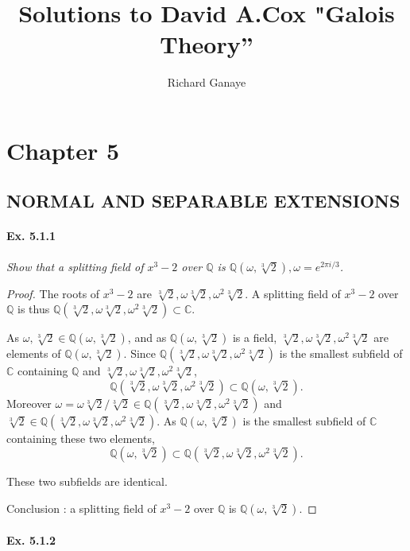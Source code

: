 \documentclass[11pt,a4paper]{article}
\title{Solutions to David A.Cox  "Galois Theory''}
\author{Richard Ganaye}
\newcommand{\Q}{\mathbb{Q}}
\newcommand{\C}{\mathbb{C}}
\begin{document}
\maketitle

\section{Chapter 5}

\subsection{NORMAL AND SEPARABLE EXTENSIONS}

\paragraph{Ex. 5.1.1}

{\it Show that a splitting field of $x^3-2$ over $\Q$ is $\Q(\omega,\sqrt[3]{2}), \omega = e^{2\pi i/3}$.
}

\begin{proof}
The roots of $x^3-2$ are $\sqrt[3]{2},\omega \sqrt[3]{2},\omega^2 \sqrt[3]{2}$. A splitting field of $x^3-2$ over $\Q$ is thus $\Q(\sqrt[3]{2},\omega \sqrt[3]{2},\omega^2 \sqrt[3]{2}) \subset \C$.

As $\omega,\sqrt[3]{2} \in \Q(\omega,\sqrt[3]{2})$, and as $\Q(\omega,\sqrt[3]{2})$ is a field, $\sqrt[3]{2},\omega \sqrt[3]{2},\omega^2 \sqrt[3]{2}$ are elements of $\Q(\omega,\sqrt[3]{2})$. Since $\Q(\sqrt[3]{2},\omega \sqrt[3]{2},\omega^2 \sqrt[3]{2}) $ is the smallest subfield of $\C$ containing $\Q$ and $\sqrt[3]{2},\omega \sqrt[3]{2},\omega^2 \sqrt[3]{2}$,
$$\Q(\sqrt[3]{2},\omega \sqrt[3]{2},\omega^2 \sqrt[3]{2}) \subset \Q(\omega,\sqrt[3]{2}).$$
Moreover  $ \omega = \omega\sqrt[3]{2} / \sqrt[3]{2} \in \Q(\sqrt[3]{2},\omega \sqrt[3]{2},\omega^2 \sqrt[3]{2})$ and $\sqrt[3]{2} \in \Q(\sqrt[3]{2},\omega \sqrt[3]{2},\omega^2 \sqrt[3]{2})$. As $\Q(\omega,\sqrt[3]{2})$ is the smallest subfield of $\C$ containing these two elements, 
 $$\Q(\omega,\sqrt[3]{2}) \subset \Q(\sqrt[3]{2},\omega \sqrt[3]{2},\omega^2 \sqrt[3]{2}).$$
 
These two subfields are identical.
 
 Conclusion : a splitting field of $x^3-2$ over $\Q$ is $\Q(\omega,\sqrt[3]{2})$.
\end{proof}

\paragraph{Ex. 5.1.2}
\end{document}
